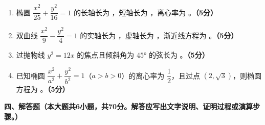 \documentclass[12pt, a4paper]{ctexart}
\newcommand{\score}[1]{\hfill\textbf{（#1分）}}
\begin{document}
\begin{enumerate}[resume]
\item 椭圆 $\dfrac{x^2}{25}+\dfrac{y^2}{16}=1$ 的长轴长为 \underline{\hspace{2cm}}，短轴长为 \underline{\hspace{2cm}}，离心率为 \underline{\hspace{2cm}}。\score{5}

\item 双曲线 $\dfrac{x^2}{9}-\dfrac{y^2}{4}=1$ 的实轴长为 \underline{\hspace{2cm}}，虚轴长为 \underline{\hspace{2cm}}，渐近线方程为 \underline{\hspace{3cm}}。\score{5}

\item 过抛物线 $y^2=12x$ 的焦点且倾斜角为 $45°$ 的弦长为 \underline{\hspace{2cm}}。\score{5}

\item 已知椭圆 $\dfrac{x^2}{a^2}+\dfrac{y^2}{b^2}=1$（$a>b>0$）的离心率为 $\dfrac{1}{2}$，且过点 $(2,\sqrt{3})$，则椭圆方程为 \underline{\hspace{5cm}}。\score{5}
\end{enumerate}

\vspace{1em}

\noindent\textbf{四、解答题（本大题共6小题，共70分。解答应写出文字说明、证明过程或演算步骤。）}

\vspace{0.5em}
\end{document}
